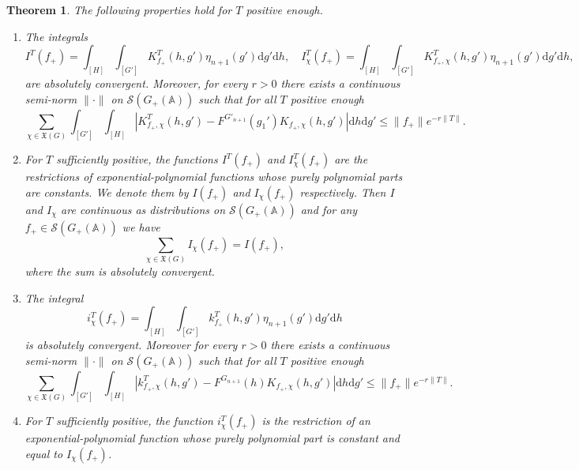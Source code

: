 \documentclass[letterpaper,11pt]{amsart}
\newcommand{\fX}{\mathfrak{X}}
\newcommand{\bA}{\mathbb{A}}
\newcommand{\cS}{\mathcal{S}}
\newcommand{\rd}{\mathrm{d}}
\newcommand{\<}{\negthickspace}
\providecommand{\aabs}[1]{\lVert#1\rVert}
\newcommand{\valP}[1]{\left|#1\right|}
\theoremstyle{definition}
\theoremstyle{plain}
\newtheorem{theorem}[definition]{Theorem}
\theoremstyle{remark}
\numberwithin{equation}{section}
\begin{document}
    \begin{theorem}
        \label{thm:truncated_prop}
        The following properties hold for $T$ positive enough.
        \begin{enumerate}
            \item \cite[Theorem~5.8]{BLX1} The integrals 
            \begin{equation*}
                I^T(f_+)=\int_{[H]} \int_{[G']} K_{f_+}^T(h,g') \eta_{n+1}(g') \rd g' \rd h, \quad I^T_\chi(f_+)=\int_{[H]} \int_{[G']} K_{f_+,\chi}^T(h,g') \eta_{n+1}(g')\rd g'\rd h,
            \end{equation*}
            are absolutely convergent. Moreover, for every $r>0$ there exists a continuous semi-norm $\aabs{\cdot}$ on $\cS(G_+(\bA))$ such that for all $T$ positive enough
            \begin{equation*}
                \sum_{\chi \in \fX(G)} \int_{[G']} \int_{[H]} \valP{K_{f_+,\chi}^T(h,g')-F^{G'_{n+1}}(g_1') K_{f_+,\chi}(h,g') } \rd h\rd g' \leq \aabs{f_+} e^{-r \aabs{T}}.
            \end{equation*}
            \item \cite[Theorem~5.10]{BLX1} For $T$ sufficiently positive, the functions $I^T(f_+)$ and $I_{\chi}^T(f_+)$ are the
            restrictions of exponential-polynomial functions whose purely polynomial parts
            are constants. We denote them by $I(f_+)$ and $I_{\chi}(f_+)$ respectively. 
            Then $I$ and $I_\chi$ are continuous as distributions on $\cS(G_+(\bA))$ 
            and for any $f_+ \in \cS(G_+(\bA))$ we have
                \[
                \sum_{\chi \in \fX(G)} I_{\chi}(f_+) = I(f_+),
                \]
            where the sum is absolutely convergent.
            \item \cite[Proposition~5.13]{BLX1} The integral 
            \begin{equation*}
                i^T_\chi(f_+)=\int_{[H]} \int_{[G']} k_{f_+}^T(h,g') \eta_{n+1}(g')\rd g'\rd h
            \end{equation*}
            is absolutely convergent. Moreover for every $r>0$ there exists a continuous semi-norm $\aabs{\cdot}$ on $\cS(G_+(\bA))$ such that for all $T$ positive enough
            \begin{equation*}
                \sum_{\chi \in \fX(G)}\int_{[G']} \int_{[H]} \valP{k_{f_+,\chi}^T(h,g')-F^{G_{n+1}}(h) K_{f_+,\chi}(h,g') } \rd h\rd g' \leq \aabs{f_+} e^{-r \aabs{T}}.
            \end{equation*}
            \item \cite[Section~5.14]{BLX1} For $T$ sufficiently positive, the function $i^T_\chi(f_+)$ is the restriction of an exponential-polynomial function whose purely polynomial part
            is constant and equal to $I_\chi(f_+)$.
        \end{enumerate}
    \end{theorem}
\end{document}
